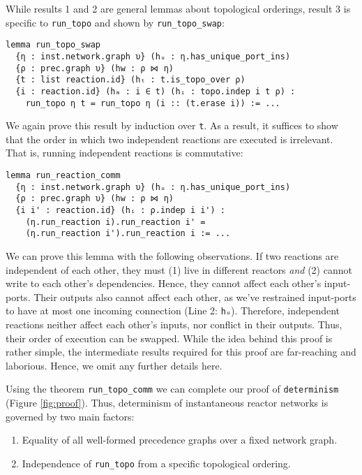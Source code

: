 \noindent While results 1 and 2 are general lemmas about topological orderings, result 3 is specific to \lstinline{run_topo} and shown by \lstinline{run_topo_swap}:

\begin{lstlisting}
lemma run_topo_swap 
  {η : inst.network.graph υ} (hᵤ : η.has_unique_port_ins) 
  {ρ : prec.graph υ} (hw : ρ ⋈ η) 
  {t : list reaction.id} (hₜ : t.is_topo_over ρ) 
  {i : reaction.id} (hₘ : i ∈ t) (hᵢ : topo.indep i t ρ) :
    run_topo η t = run_topo η (i :: (t.erase i)) := ...
\end{lstlisting}

\noindent We again prove this result by induction over \lstinline{t}.
As a result, it suffices to show that the order in which two independent reactions are executed is irrelevant.
That is, running independent reactions is commutative:

\lstset{numbers=left, xleftmargin=1.5em}
\begin{lstlisting}
lemma run_reaction_comm 
  {η : inst.network.graph υ} (hᵤ : η.has_unique_port_ins) 
  {ρ : prec.graph υ} (hw : ρ ⋈ η) 
  {i i' : reaction.id} (hᵢ : ρ.indep i i') :
    (η.run_reaction i).run_reaction i' = 
    (η.run_reaction i').run_reaction i := ...
\end{lstlisting}
\lstset{numbers=none, xleftmargin=0em}

\noindent We can prove this lemma with the following observations.
If two reactions are independent of each other, they must (1) live in different reactors \emph{and} (2) cannot write to each other's dependencies. 
Hence, they cannot affect each other's input-ports.
Their outputs also cannot affect each other, as we've restrained input-ports to have at most one incoming connection (Line 2: \lstinline{hᵤ}).
Therefore, independent reactions neither affect each other's inputs, nor conflict in their outputs.
Thus, their order of execution can be swapped.
While the idea behind this proof is rather simple, the intermediate results required for this proof are far-reaching and laborious.
Hence, we omit any further details here.

\vspace{3mm}

\noindent Using the theorem \lstinline{run_topo_comm} we can complete our proof of \lstinline{determinism} (Figure \ref{fig:proof}).
Thus, determinism of instantaneous reactor networks is governed by two main factors:

\begin{enumerate}
    \item Equality of all well-formed precedence graphs over a fixed network graph.
    \item Independence of \lstinline{run_topo} from a specific topological ordering.
\end{enumerate}

